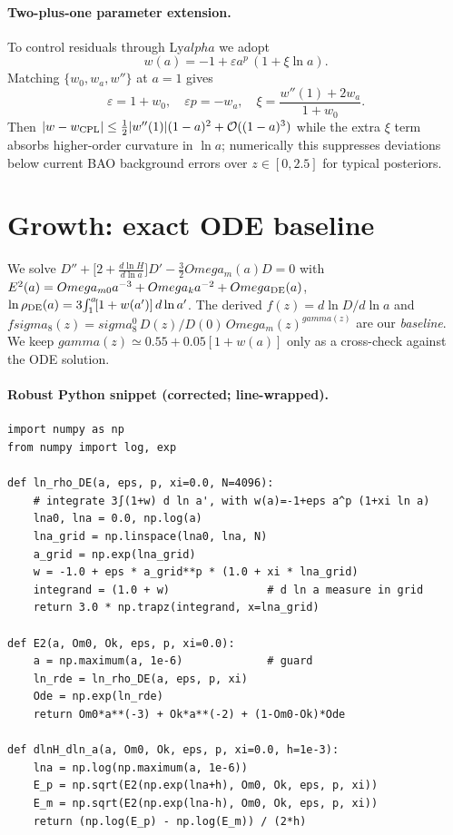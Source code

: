 \documentclass[aps,prd,twocolumn,amsmath,amssymb,nofootinbib,superscriptaddress]{revtex4-2}
\def\alpha{alpha}\def\beta{beta}\def\gamma{gamma}%
\def\Omega{Omega}\def\sigma{sigma}\def\chi{chi}\def\ell{ell}%
\begin{document}
\paragraph*{Two-plus-one parameter extension.}
To control residuals through Ly$\alpha$ we adopt
\[
w(a)=-1+\varepsilon a^p\,(1+\xi\ln a).
\]
Matching $\{w_0,w_a,w''\}$ at $a=1$ gives
\[
\varepsilon=1+w_0,\quad
\varepsilon p=-w_a,\quad
\xi=\frac{w''(1)+2w_a}{1+w_0}.
\]
Then $|w-w_{\rm CPL}|\le \tfrac{1}{2}|w''(1)|(1-a)^2+{\cal O}((1-a)^3)$ while the extra $\xi$ term absorbs higher-order curvature in $\ln a$; numerically this suppresses deviations below current BAO background errors over $z\in[0,2.5]$ for typical posteriors.

\section{Growth: exact ODE baseline}
\label{app:growth_exact}

We solve $D''+\bigl[2+\tfrac{d\ln H}{d\ln a}\bigr]D'-\tfrac{3}{2}\Omega_m(a)D=0$ with
$E^2(a)=\Omega_{m0}a^{-3}+\Omega_k a^{-2}+\Omega_{\rm DE}(a)$,
$\ln\rho_{\rm DE}(a)=3\!\int_{1}^{a}\![1+w(a')]\,d\ln a'$.
The derived $f(z)=d\ln D/d\ln a$ and $f\sigma_8(z)=\sigma_8^0\,D(z)/D(0)\,\Omega_m(z)^{\gamma(z)}$ are our \emph{baseline}.
We keep $\gamma(z)\simeq 0.55+0.05[1+w(a)]$ \cite{Linder2005} only as a cross-check against the ODE solution.

\paragraph*{Robust Python snippet (corrected; line-wrapped).}
\begin{lstlisting}
import numpy as np
from numpy import log, exp

def ln_rho_DE(a, eps, p, xi=0.0, N=4096):
    # integrate 3∫(1+w) d ln a', with w(a)=-1+eps a^p (1+xi ln a)
    lna0, lna = 0.0, np.log(a)
    lna_grid = np.linspace(lna0, lna, N)
    a_grid = np.exp(lna_grid)
    w = -1.0 + eps * a_grid**p * (1.0 + xi * lna_grid)
    integrand = (1.0 + w)               # d ln a measure in grid
    return 3.0 * np.trapz(integrand, x=lna_grid)

def E2(a, Om0, Ok, eps, p, xi=0.0):
    a = np.maximum(a, 1e-6)             # guard
    ln_rde = ln_rho_DE(a, eps, p, xi)
    Ode = np.exp(ln_rde)
    return Om0*a**(-3) + Ok*a**(-2) + (1-Om0-Ok)*Ode

def dlnH_dln_a(a, Om0, Ok, eps, p, xi=0.0, h=1e-3):
    lna = np.log(np.maximum(a, 1e-6))
    E_p = np.sqrt(E2(np.exp(lna+h), Om0, Ok, eps, p, xi))
    E_m = np.sqrt(E2(np.exp(lna-h), Om0, Ok, eps, p, xi))
    return (np.log(E_p) - np.log(E_m)) / (2*h)
\end{lstlisting}
\end{document}
